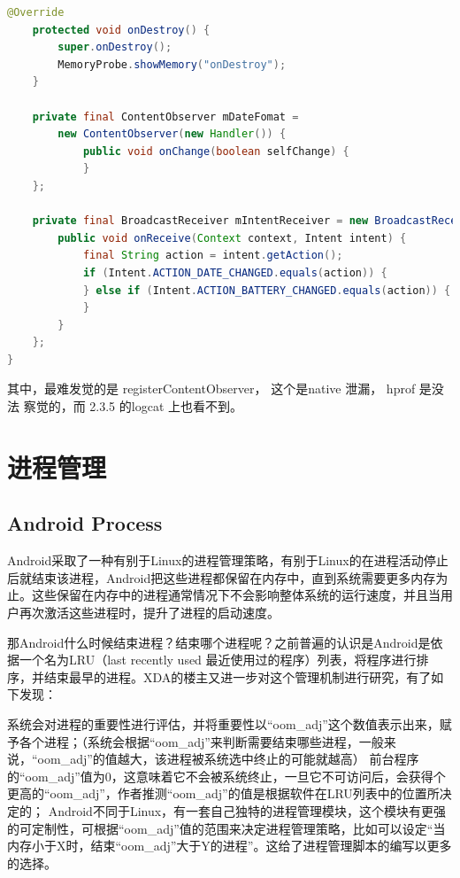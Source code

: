 \documentclass[a4paper, 11pt]{article}
\begin{document}
\begin{lstlisting}[language=java,]
    @Override
    protected void onDestroy() {	
        super.onDestroy();
        MemoryProbe.showMemory("onDestroy");
    }

    private final ContentObserver mDateFomat = 
        new ContentObserver(new Handler()) {
            public void onChange(boolean selfChange) {
            }
    };

    private final BroadcastReceiver mIntentReceiver = new BroadcastReceiver() {
        public void onReceive(Context context, Intent intent) {
            final String action = intent.getAction();
            if (Intent.ACTION_DATE_CHANGED.equals(action)) {
            } else if (Intent.ACTION_BATTERY_CHANGED.equals(action)) {
            }
        }
    };
}
\end{lstlisting}

其中，最难发觉的是 registerContentObserver， 这个是native 泄漏， hprof 是没法
察觉的，而 2.3.5 的logcat 上也看不到。

\section{进程管理}
\subsection{Android Process}
Android采取了一种有别于Linux的进程管理策略，有别于Linux的在进程活动停止后就结束该进程，Android把这些进程都保留在内存中，直到系统需要更多内存为止。这些保留在内存中的进程通常情况下不会影响整体系统的运行速度，并且当用户再次激活这些进程时，提升了进程的启动速度。

那Android什么时候结束进程？结束哪个进程呢？之前普遍的认识是Android是依据一个名为LRU（last recently used 最近使用过的程序）列表，将程序进行排序，并结束最早的进程。XDA的楼主又进一步对这个管理机制进行研究，有了如下发现：

系统会对进程的重要性进行评估，并将重要性以“oom_adj”这个数值表示出来，赋予各个进程；（系统会根据“oom_adj”来判断需要结束哪些进程，一般来说，“oom_adj”的值越大，该进程被系统选中终止的可能就越高）
前台程序的“oom_adj”值为0，这意味着它不会被系统终止，一旦它不可访问后，会获得个更高的“oom_adj”，作者推测“oom_adj”的值是根据软件在LRU列表中的位置所决定的；
Android不同于Linux，有一套自己独特的进程管理模块，这个模块有更强的可定制性，可根据“oom_adj”值的范围来决定进程管理策略，比如可以设定“当内存小于X时，结束“oom_adj”大于Y的进程”。这给了进程管理脚本的编写以更多的选择。
\end{document}
